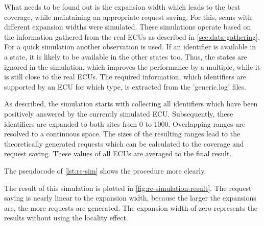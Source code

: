 What needs to be found out is the expansion width which leads to the best coverage, while maintaining an appropriate request saving. For this, scans with different expansion widths were simulated. These simulations operate based on the information gathered from the real ECUs as described in \autoref{sec:data-gathering}. For a quick simulation another observation is used. If an identifier is available in a state, it is likely to be available in the other states too. Thus, the states are ignored in the simulation, which improves the performance by a multiple, while it is still close to the real ECUs. The required information, which identifiers are supported by an ECU for which type, is extracted from the 'generic.log' files.

As described, the simulation starts with collecting all identifiers which have been positively answered by the currently simulated ECU. Subsequently, these identifiers are expanded to both sites from 0 to 1000. Overlapping ranges are resolved to a continuous space. The sizes of the resulting ranges lead to the theoretically generated requests which can be calculated to the coverage and request saving. These values of all ECUs are averaged to the final result.
 
The pseudocode of \autoref{lst:rc-sim} shows the procedure more clearly.


The result of this simulation is plotted in \autoref{fig:rc-simulation-result}. The request saving is nearly linear to the expansion width, because the larger the expansions are, the more requests are generated. The expansion width of zero represents the results without using the locality effect.

